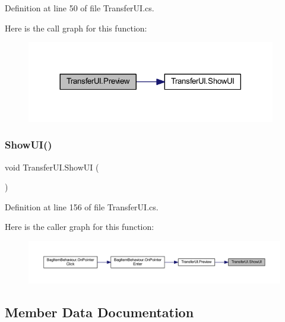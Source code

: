 Definition at line 50 of file Transfer\+U\+I.\+cs.

Here is the call graph for this function\+:
\nopagebreak
\begin{figure}[H]
\begin{center}
\leavevmode
\includegraphics[width=308pt]{class_transfer_u_i_a52bd586cae27d6570e207d856457a116_cgraph}
\end{center}
\end{figure}
\mbox{\label{class_transfer_u_i_acb1dacb30d206743a569f8dc6bf9e5e4}} 
\subsubsection{\texorpdfstring{ShowUI()}{ShowUI()}}
{\footnotesize\ttfamily void Transfer\+U\+I.\+Show\+UI (\begin{DoxyParamCaption}{ }\end{DoxyParamCaption})}



Definition at line 156 of file Transfer\+U\+I.\+cs.

Here is the caller graph for this function\+:
\nopagebreak
\begin{figure}[H]
\begin{center}
\leavevmode
\includegraphics[width=350pt]{class_transfer_u_i_acb1dacb30d206743a569f8dc6bf9e5e4_icgraph}
\end{center}
\end{figure}


\subsection{Member Data Documentation}
\mbox{\label{class_transfer_u_i_a7a235277eb0406680963562b2088d136}} 

